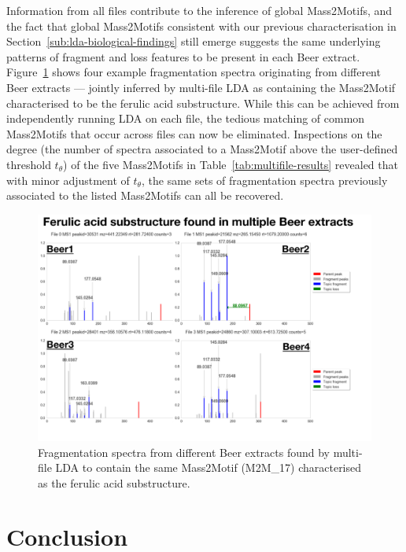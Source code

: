 Information from all files contribute to the inference of global Mass2Motifs, and the fact that global Mass2Motifs consistent with our previous characterisation in Section~\ref{sub:lda-biological-findings} still emerge suggests the same underlying patterns of fragment and loss features to be present in each Beer extract. Figure~\ref{fig:multifile-lda} shows four example fragmentation spectra originating from different Beer extracts --- jointly inferred by multi-file LDA as containing the Mass2Motif characterised to be the ferulic acid substructure. While this can be achieved from independently running LDA on each file, the tedious matching of common Mass2Motifs that occur across files can now be eliminated. Inspections on the degree (the number of spectra associated to a Mass2Motif above the user-defined threshold $t_{\theta}$) of the five Mass2Motifs in Table~\ref{tab:multifile-results} revealed that with minor adjustment of $t_{\theta}$, the same sets of fragmentation spectra previously associated to the listed Mass2Motifs can all be recovered. 

\begin{figure}[!htbp]
\centering\includegraphics[width=1.0\linewidth]{07-lda/figures/multifile.pdf}
\centering\caption{Fragmentation spectra from different Beer extracts found by multi-file LDA to contain the same Mass2Motif (M2M_17) characterised as the ferulic acid substructure.\label{fig:multifile-lda}}
\end{figure}

\section{Conclusion}

